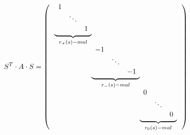 \documentclass{article}
\begin{document}
\begin{preview}
\begin{equation*}
S^T \cdot A \cdot S =
\left( \,
\begin{array}{r@{}r@{}r r r}  %
  \underbrace{
      \begin{array}{rrr}    %
        1 &        &   \\
          & \ddots &   \\
          &        & 1 \\
      \end{array}
  }_{r_+(s)-mal}\\
  & 
  \underbrace{
      \begin{array}{rrr}    %
        -1 &        &   \\
           & \ddots &   \\
           &        & -1\\
      \end{array}
  }_{r_{-}(s)-mal} \\
  & & 
  \underbrace{
      \begin{array}{rrr}    %
        0  &        &  \\
           & \ddots &  \\
           &        & 0\\
      \end{array}
  }_{r_0(s)-mal} \\
\end{array}\,\right)
\end{equation*}
\end{preview}
\end{document}
